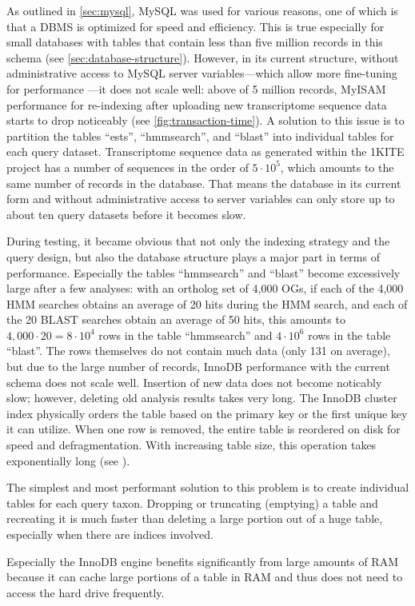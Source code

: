 As outlined in \autoref{sec:mysql}, MySQL was used for various reasons, one of
which is that a DBMS is optimized for speed and efficiency. This is true
especially for small databases with tables that contain less than five million
records in this schema (see \autoref{sec:database-structure}). However, in its
current structure, without administrative access to MySQL server
variables---which allow more fine-tuning for performance
\citep{schwartz2012}---it does not scale well: above of 5 million records,
MyISAM performance for re-indexing after uploading new transcriptome sequence
data starts to drop noticeably (see \autoref{fig:transaction-time}). A solution
to this issue is to partition the tables ``ests'', ``hmmsearch'', and ``blast''
into individual tables for each query dataset. Transcriptome sequence data as
generated within the 1KITE project has a number of sequences in the order of
$5\cdot10^5$, which amounts to the same number of records in the database. That
means the database in its current form and without administrative access to
server variables can only store up to about ten query datasets before it becomes
slow.



During testing, it became obvious that not only the indexing strategy and the
query design, but also the database structure plays a major part in terms of
performance. Especially the tables ``hmmsearch'' and ``blast'' become
excessively large after a few analyses: with an ortholog set of 4,000 OGs, if
each of the 4,000 HMM searches obtains an average of 20 hits during the HMM
search, and each of the 20 BLAST searches obtain an average of 50 hits, this
amounts to $4,000 \cdot 20 = 8 \cdot 10^4$ rows in the table ``hmmsearch'' and
$4 \cdot 10^6$ rows in the table ``blast''. The rows themselves do not contain
much data (only 131  on average), but due to the large
number of records, InnoDB performance with the current schema does not scale
well. Insertion of new data does not become noticably slow; however, deleting
old analysis results takes very long. The InnoDB cluster index physically orders
the table based on the primary key or the first unique key it can utilize. When
one row is removed, the entire table is reordered on disk for speed and
defragmentation.  With increasing table size, this operation takes exponentially
long (see ).

The simplest and most performant solution to this problem is to create
individual tables for each query taxon. Dropping or truncating (emptying) a
table and recreating it is much faster than deleting a large portion out of a
huge table, especially when there are indices involved.

Especially the InnoDB engine
benefits significantly from large amounts of RAM \citep{schwartz2012} because
it can cache large portions of a table in RAM and thus does not need to access
the hard drive frequently.

